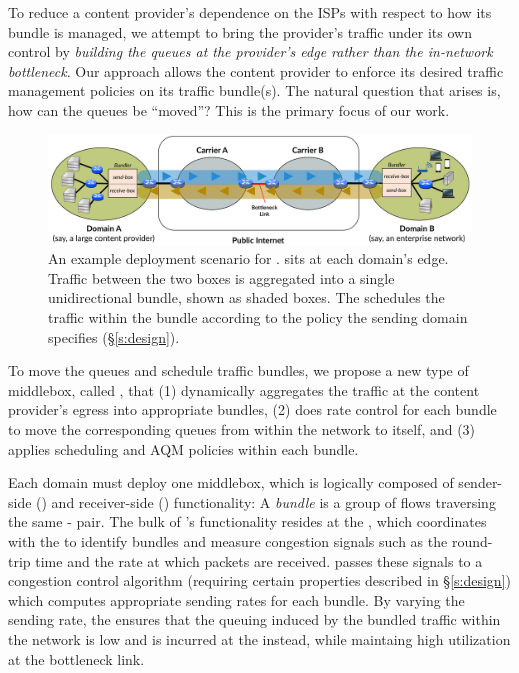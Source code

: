 To reduce a content provider's dependence on the ISPs with respect to how its bundle is managed, we attempt to bring the provider's traffic under its own control by \emph{building the queues at the provider's edge rather than the in-network bottleneck}.
Our approach allows the content provider to enforce its desired traffic management policies on its traffic bundle(s).
The natural question that arises is, how can the queues be ``moved''? This is the primary focus of our work. 

\begin{figure}[t]
    \centering
    \includegraphics[width=\textwidth]{img/deployment-arch.pdf}
    \caption{An example deployment scenario for \name. 
    \name sits at each domain's edge. Traffic between the two boxes is aggregated into a single unidirectional bundle, shown as shaded boxes. The \inbox schedules the traffic within the bundle according to the policy the sending domain specifies (\S\ref{s:design}).
    }\label{fig:deploy:arch}
\end{figure}

To move the queues and schedule traffic bundles, we propose a new type of middlebox, called \name, that (1) dynamically aggregates the traffic at the content provider's egress into appropriate bundles, (2) does rate control for each bundle to move the corresponding queues from within the network to itself, and (3) applies scheduling and AQM policies within each bundle. 

Each domain must deploy one middlebox, which is logically composed of sender-side (\inbox) and receiver-side (\outbox) functionality:
A \emph{bundle} is a group of flows traversing the same \inbox{}-\outbox{} pair.
The bulk of \name's functionality resides at the \inbox, which coordinates with the \outbox to identify bundles and measure congestion signals such as the round-trip time and the rate at which packets are received.
\inbox passes these signals to a congestion control algorithm (requiring certain properties described in \S\ref{s:design}) which computes appropriate sending rates for each bundle. 
By varying the sending rate, the \inbox ensures that the queuing induced by the bundled traffic within the network is low and is incurred at the \inbox instead, while maintaing high utilization at the bottleneck link.
 
